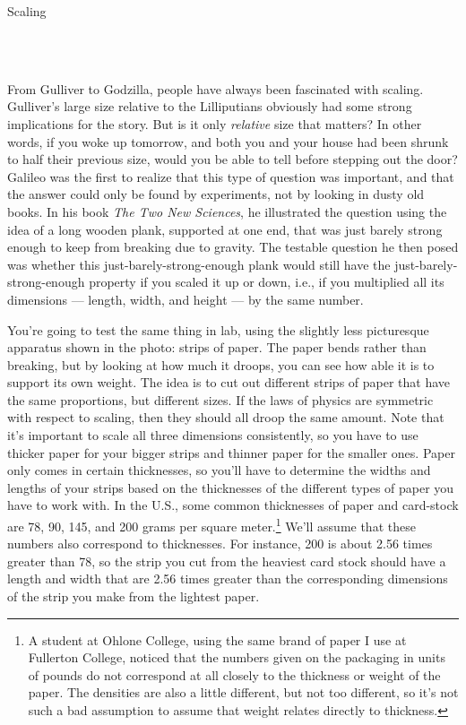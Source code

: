 \begin{lab}{Scaling}

\apparatus
{}\\
\\


\labintroduction

From Gulliver to Godzilla, people have always been fascinated with
scaling.
Gulliver's large size relative to the Lilliputians obviously had some strong
implications for the story. But is it only \emph{relative} size that matters?
In other words, if you woke up tomorrow, and both you and your house had been
shrunk to half their previous size, would you be able to tell before stepping
out the door? Galileo was the first to realize that this type of question was
important, and that the answer could only be found by experiments, not by looking
in dusty old books. In his book \emph{The Two New Sciences}, he illustrated
the question using the idea of a long wooden plank, supported at one end, that
was just barely strong enough to keep from breaking due to gravity. The testable
question he then posed was whether this just-barely-strong-enough plank would
still have the just-barely-strong-enough property if you scaled it up or down,
i.e., if you multiplied all its dimensions --- length, width, and height ---
by the same number.


You're going to test the same thing in lab, using the slightly less picturesque
apparatus shown in the photo: strips of paper. The paper bends rather than breaking,
but by looking at how much it droops, you can see how able it is to support its
own weight.
The idea is to cut out different
strips of paper that have the same proportions, but different sizes. If the
laws of physics are symmetric with respect to scaling, then they should all
droop the same amount. Note that it's important to scale all three dimensions
consistently, so you have to use thicker paper for your bigger strips and
thinner paper for the smaller ones. Paper only comes in certain thicknesses,
so you'll have to determine the widths and lengths of your strips based on
the thicknesses of the different types of paper you have to work with. 
In the U.S., some common thicknesses of paper and card-stock are
78, 90, 145, and 200 grams per square meter.\footnote{A student at Ohlone College,
using the same brand of paper I use at Fullerton College,
noticed that the numbers given on the packaging in units of pounds
do not correspond at all closely to the thickness or weight of the paper. The
densities are also a little different, but not too different, so it's not such
a bad assumption to assume that weight relates directly to thickness.}
We'll assume that these numbers also correspond
to thicknesses. For instance, 200 is about 2.56 times greater than 78, so the
strip you cut from the heaviest card stock should have a length and
width that are 2.56 times greater than the corresponding dimensions of
the strip you make from the lightest paper.


\end{lab}
